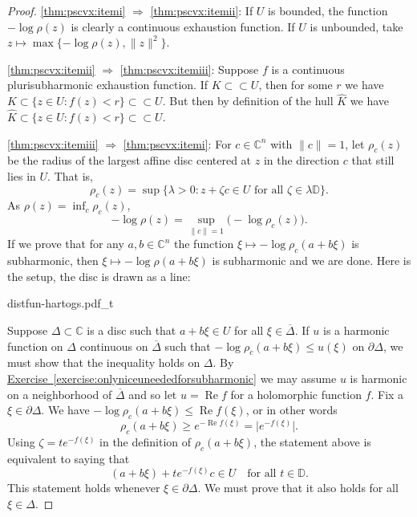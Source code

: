 \documentclass[12pt,openany]{book}
\renewcommand{\Re}{\operatorname{Re}}
\newcommand{\snorm}[1]{\lVert {#1} \rVert}
\newcommand{\babs}[1]{\bigl\lvert {#1} \bigr\rvert}
\newcommand{\C}{{\mathbb{C}}}
\newcommand{\D}{{\mathbb{D}}}
\theoremstyle{plain}
\theoremstyle{remark}
\theoremstyle{definition}
\newenvironment{myfig}{%
    \begin{center}
}{%
    \end{center}
}
\theoremstyle{exercise}
\theoremstyle{example}
\newcommand{\exerciseref}[1]{\hyperref[#1]{Exercise~\ref*{#1}}}
\begin{document}
\begin{proof}
\ref{thm:pscvx:itemi}
$\Rightarrow$
\ref{thm:pscvx:itemii}:
If $U$ is bounded,
the function $-\log \rho(z)$ is clearly a continuous exhaustion function.
If $U$ is unbounded, take 
$z \mapsto \max \{ -\log \rho(z) , \snorm{z}^2 \}$.

\ref{thm:pscvx:itemii}
$\Rightarrow$
\ref{thm:pscvx:itemiii}:
Suppose $f$ is a continuous plurisubharmonic exhaustion function.
If $K \subset \subset U$, then for some $r$ we have
$K \subset \{ z \in U : f(z) < r \} \subset \subset U$.
But then by definition of the hull $\widehat{K}$ we have
$\widehat{K} \subset \{ z \in U : f(z) < r \} \subset \subset U$.

\ref{thm:pscvx:itemiii}
$\Rightarrow$
\ref{thm:pscvx:itemi}:
For $c \in \C^n$ with $\snorm{c}=1$, let
$\rho_c(z)$ be the radius of the largest affine disc centered at $z$
in the direction $c$ that still lies in $U$.  That is,
\begin{equation*}
\rho_c(z) =
\sup \bigl\{ \lambda > 0 :
z+ \zeta c \in U \text{ for all $\zeta \in \lambda\D$} \bigr\} .
\end{equation*}
As $\rho(z) = \inf_c \rho_c(z)$,
\begin{equation*}
- \log \rho(z) = \sup_{\snorm{c}=1} \bigl(-\log \rho_c(z)\bigr) .
\end{equation*}
If we prove that for any $a, b \in \C^n$ the function $\xi \mapsto -\log \rho_c(a+b\xi)$ is
subharmonic, then $\xi \mapsto - \log \rho(a+b\xi)$ is subharmonic and we are done.
Here is the setup, the disc is drawn as a line:
\begin{myfig}
{distfun-hartogs.pdf_t}
\end{myfig}

Suppose $\Delta \subset \C$ is a disc such that
$a+b\xi \in U$
for all $\xi \in
\overline{\Delta}$.
If $u$ is a harmonic function on $\Delta$ continuous on $\overline{\Delta}$
such that
$- \log \rho_c(a+b\xi) \leq u(\xi)$ on $\partial \Delta$, we must
show that 
the inequality holds on $\Delta$.
By \exerciseref{exercise:onlyniceuneededforsubharmonic}
we may assume $u$ is harmonic on a neighborhood of $\overline{\Delta}$
and so let $u = \Re f$ for a holomorphic function $f$.
Fix a $\xi \in \partial \Delta$.  We have  $- \log \rho_c(a+b\xi) \leq \Re
f(\xi)$,
or in other words
\begin{equation*}
\rho_c(a+b\xi) \geq e^{-\Re f(\xi)} = \babs{e^{-f(\xi)}}.
\end{equation*}
Using $\zeta = t e^{-f(\xi)}$ in the definition of $\rho_c(a+b\xi)$, the statement above is equivalent
to saying that 
\begin{equation*}
(a+b\xi)+te^{-f(\xi)}c \in U \quad \text{for all $t \in \D$}.
\end{equation*}
This statement holds whenever $\xi \in \partial \Delta$.  We must prove that
it also holds for all $\xi \in \Delta$.


\end{proof}
\end{document}

